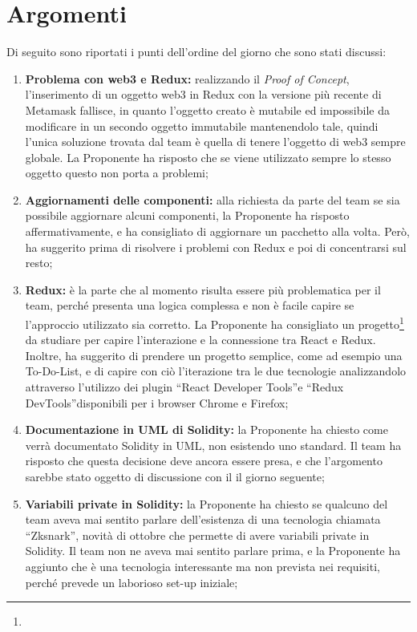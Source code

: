 \documentclass[VER-2018-01-09.tex]{subfiles}
\begin{document}
\section{Argomenti}
Di seguito sono riportati i punti dell'ordine del giorno che sono stati discussi:
\begin{enumerate}
	\item \textbf{Problema con web3 e Redux:} realizzando il \textit{Proof of Concept}, l'inserimento di un oggetto web3 in Redux con la versione più recente di Metamask fallisce, in quanto l'oggetto creato è mutabile ed impossibile da modificare in un secondo oggetto immutabile mantenendolo tale, quindi l'unica soluzione trovata dal team è quella di tenere l'oggetto di web3 sempre globale. La Proponente ha risposto che se viene utilizzato sempre lo stesso oggetto questo non porta a problemi;
	\item \textbf{Aggiornamenti delle componenti:} alla richiesta da parte del team se sia possibile aggiornare alcuni componenti, la Proponente ha risposto affermativamente, e ha consigliato di aggiornare un pacchetto alla volta. Però, ha suggerito prima di risolvere i problemi con Redux e poi di concentrarsi sul resto;
	\item \textbf{Redux:} è la parte che al momento risulta essere più problematica per il team, perché presenta una logica complessa e non è facile capire se l'approccio utilizzato sia corretto. La Proponente ha consigliato un progetto\footnote{} da studiare per capire l'interazione e la connessione tra React e Redux. Inoltre, ha suggerito di prendere un progetto semplice, come ad esempio una To-Do-List, e di capire con ciò l'iterazione tra le due tecnologie analizzandolo attraverso l'utilizzo dei plugin \textquotedblleft React Developer Tools\textquotedblright e \textquotedblleft Redux DevTools\textquotedblright disponibili per i browser Chrome e Firefox;
	\item \textbf{Documentazione in UML di Solidity:} la Proponente ha chiesto come verrà documentato Solidity in UML, non esistendo uno standard. Il team ha risposto che questa decisione deve ancora essere presa, e che l'argomento sarebbe stato oggetto di discussione con il \Vardanega il giorno seguente;
	\item \textbf{Variabili private in Solidity:} la Proponente ha chiesto se qualcuno del team aveva mai sentito parlare dell'esistenza di una tecnologia chiamata \textquotedblleft Zksnark\textquotedblright, novità di ottobre che permette di avere variabili private in Solidity. Il team non ne aveva mai sentito parlare prima, e la Proponente ha aggiunto che è una tecnologia interessante ma non prevista nei requisiti, perché prevede un laborioso set-up iniziale;

\end{enumerate}
\end{document}
